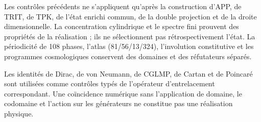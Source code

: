 Les contrôles précédents ne s'appliquent qu'après la construction d'APP, de TRIT, de TPK,
de l'état enrichi commun, de la double projection et de la droite dimensionnelle. La
concentration cylindrique et le spectre fini prouvent des propriétés de la
réalisation ; ils ne sélectionnent pas rétrospectivement l'état. La périodicité de
108 phases, l'atlas (81/56/13/324), l'involution constitutive et les
programmes cosmologiques conservent des domaines et des réfutateurs séparés.

Les identités de Dirac, de von Neumann, de CGLMP, de Cartan et de Poincaré sont utilisées
comme contrôles typés de l'opérateur d'entrelacement correspondant. Une coïncidence
numérique sans l'application de domaine, le codomaine et l'action sur les générateurs ne
constitue pas une réalisation physique.
